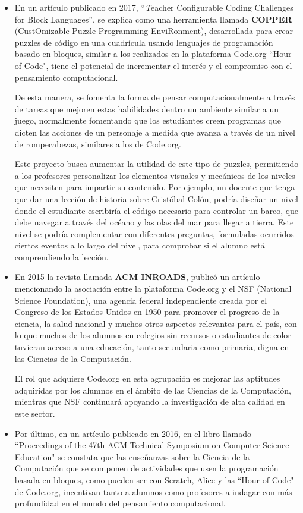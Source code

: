 \begin{itemize}
  \item En un artículo\cite{Tumlin:2017:TCC:3017680.3022467} publicado en 2017, ``{\textit Teacher Configurable Coding Challenges for Block Languages}'', se explica como una herramienta llamada \textbf{COPPER} (CustOmizable Puzzle Programming EnviRonment), desarrollada para crear puzzles de código en una cuadrícula usando lenguajes de programación basado en bloques, 
  similar a los realizados en la plataforma Code.org ``Hour of Code", tiene el potencial de incrementar el interés y el compromiso con el pensamiento computacional. 
  
  De esta manera, se fomenta la forma de pensar computacionalmente a través de tareas que mejoren estas habilidades dentro un ambiente similar a un juego, normalmente fomentando que los estudiantes creen programas que dicten las acciones de un personaje a medida que avanza a través de un nivel de rompecabezas, similares a los de Code.org.

  Este proyecto busca aumentar la utilidad de este tipo de puzzles, permitiendo a los profesores personalizar los elementos visuales y mecánicos de los niveles que necesiten para impartir su contenido. Por ejemplo, un docente que tenga que dar una lección de historia sobre Cristóbal Colón, podría diseñar un nivel donde el estudiante escribiría el código necesario para controlar un barco, 
  que debe navegar a través del océano y las olas del mar para llegar a tierra. Este nivel se podría complementar con diferentes preguntas, formuladas ocurridos ciertos eventos a lo largo del nivel, para comprobar si el alumno está comprendiendo la lección.
  
  \item En 2015 la revista llamada \textbf{ACM INROADS}, publicó un artículo\cite{Wilson:2015:HCB:2786608.2746406} mencionando la asociación entre la plataforma Code.org y el NSF (National Science Foundation), una agencia federal independiente creada por el Congreso de los Estados Unidos en 1950 para promover el progreso de la ciencia, la salud nacional y muchos otros aspectos 
  relevantes para el país, con lo que muchos de los alumnos en colegios sin recursos o estudiantes de color tuvieran acceso a una educación, tanto secundaria como primaria, digna en las Ciencias de la Computación.

  El rol que adquiere Code.org en esta agrupación es mejorar las aptitudes adquiridas por los alumnos en el ámbito de las Ciencias de la Computación, mientras que NSF continuará apoyando la investigación de alta calidad en este sector.
  \item Por último, en un artículo\cite{Brown:2016:PFD:2839509.2844661} publicado en 2016, en el libro llamado ``Proceedings of the 47th ACM Technical Symposium on Computer Science Education" se constata que las enseñanzas sobre la Ciencia de la Computación que se componen de actividades que usen la programación basada en bloques, como pueden ser con Scratch, 
  Alice y las ``Hour of Code" de Code.org, incentivan tanto a alumnos como profesores a indagar con más profundidad en el mundo del pensamiento computacional.

\end{itemize}

